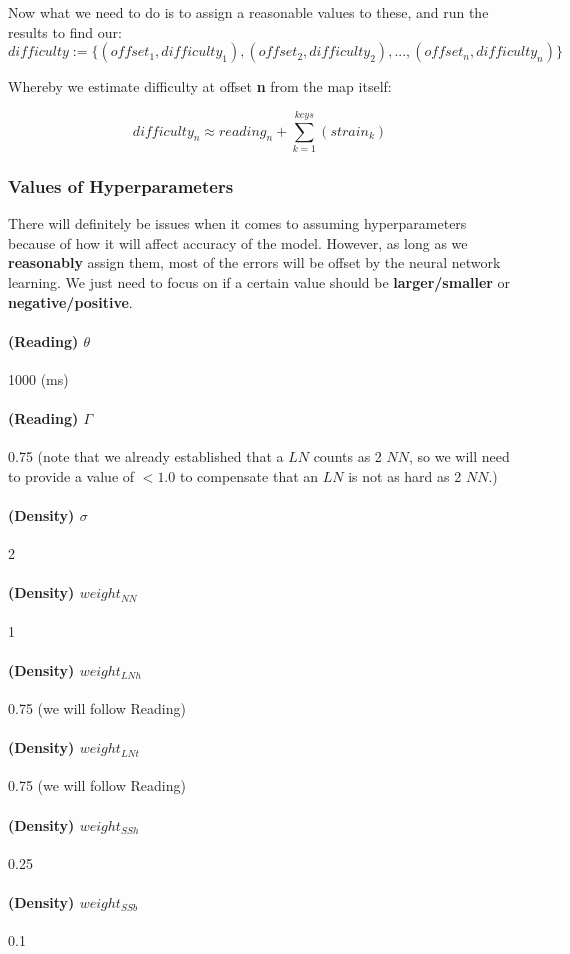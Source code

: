 Now what we need to do is to assign a reasonable values to these, and run the results to find our:
$$ difficulty := \lbrace(offset_1, difficulty_1), (offset_2, difficulty_2), ..., (offset_n, difficulty_n)\rbrace $$

Whereby we estimate difficulty at offset \textbf{n} from the map itself:

$$ difficulty_n \approx reading_n + \sum_{k=1}^{keys} \left(strain_k \right) $$

\subsubsection{Values of Hyperparameters}

There will definitely be issues when it comes to assuming hyperparameters because of how it will affect accuracy of the model. However, as long as we \textbf{reasonably} assign them, most of the errors will be offset by the neural network learning. We just need to focus on if a certain value should be \textbf{larger/smaller} or \textbf{negative/positive}.

\paragraph{(Reading) $\theta$} 1000 (ms)
\paragraph{(Reading) $\Gamma$} 0.75 (note that we already established that a $LN$ counts as 2 $NN$, so we will need to provide a value of $<1.0$ to compensate that an $LN$ is not as hard as 2 $NN$.)

\paragraph{(Density) $\sigma$} 2

\paragraph{(Density) $weight_{NN}$} 1
\paragraph{(Density) $weight_{LNh}$} 0.75 (we will follow Reading)
\paragraph{(Density) $weight_{LNt}$} 0.75 (we will follow Reading)
\paragraph{(Density) $weight_{SSh}$} 0.25
\paragraph{(Density) $weight_{SSb}$} 0.1


